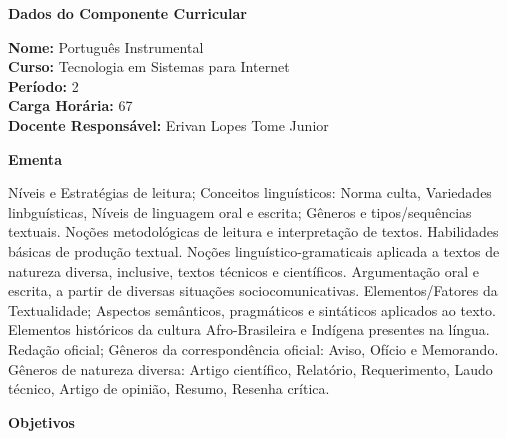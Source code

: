 

\begin{snugshade}\begin{center}\textbf{
    Dados do Componente Curricular
}\end{center}\end{snugshade}

\noindent \textbf{Nome:}                Portugu\^es Instrumental
\\        \textbf{Curso:}               Tecnologia em Sistemas para Internet
\\        \textbf{Período:}             \unit{2}{\degree}
\\        \textbf{Carga Horária:}       \unit{67}{\hour}
\\        \textbf{Docente Responsável:} Erivan Lopes Tome Junior


\begin{snugshade}\begin{center}\textbf{
    Ementa
\vphantom{q}}\end{center}\end{snugshade}

\noindent
Níveis e Estratégias de leitura; Conceitos linguísticos: Norma culta, Variedades linbguísticas, Níveis de linguagem oral e escrita; Gêneros e tipos/sequências textuais. Noções metodológicas de leitura e interpretação de textos. Habilidades básicas de produção textual. Noções linguístico-gramaticais aplicada a textos de natureza diversa, inclusive, textos técnicos e científicos. Argumentação oral e escrita, a partir de diversas situações sociocomunicativas. Elementos/Fatores da Textualidade; Aspectos semânticos, pragmáticos e sintáticos aplicados ao texto. Elementos históricos da cultura Afro-Brasileira e Indígena presentes na língua. Redação oficial; Gêneros da correspondência oficial: Aviso, Ofício e Memorando. Gêneros de natureza diversa: Artigo científico, Relatório, Requerimento, Laudo técnico, Artigo de opinião, Resumo, Resenha crítica.

\begin{snugshade}\begin{center}\textbf{
    Objetivos
}\end{center}\end{snugshade}

